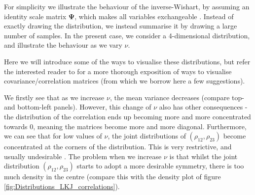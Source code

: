 \documentclass[11pt,fullpage]{book}
\begin{document}
For simplicity we illustrate the behaviour of the inverse-Wishart, by assuming an identity scale matrix $\boldsymbol{\Psi}$, which makes all variables exchangeable \cite{tokuda2011visualizing}. Instead of exactly drawing the distribution, we instead summarise it by drawing a large number of samples. In the present case, we consider a 4-dimensional distribution, and illustrate the behaviour as we vary $\nu$.

Here we will introduce some of the ways to visualise these distributions, but refer the interested reader to \cite{tokuda2011visualizing} for a more thorough exposition of ways to visualise covariance/correlation matrices (from which we borrow here a few suggestions). 


 
We firstly see that as we increase $\nu$, the mean variance decreases (compare top- and bottom-left panels). However, this change of $\nu$ also has other consequences - the distribution of the correlation ends up becoming more and more concentrated towards 0, meaning the matrices become more and more diagonal. Furthermore, we can see that for low values of $\nu$, the joint distributions of $(\rho_{12},\rho_{23})$ become concentrated at the corners of the distribution. This is very restrictive, and usually undesirable \cite{tokuda2011visualizing}. The problem when we increase $\nu$ is that whilst the joint distribution $(\rho_{12},\rho_{23})$ starts to adopt a more desirable symmetry, there is too much density in the centre (compare this with the density plot of figure \ref{fig:Distributions_LKJ_correlations}). 
\end{document}
